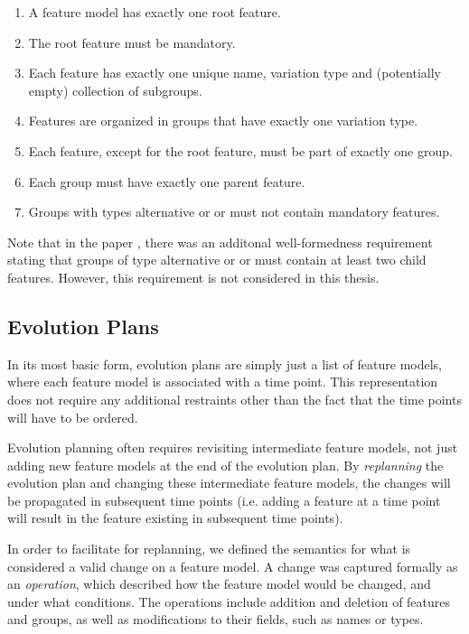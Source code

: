 \documentclass[a4paper,english]{ifimaster}
\begin{document}
\begin{enumerate}[\textit{\textbf{WF\arabic*}}, itemsep=0mm]
  \item A feature model has exactly one root feature.
  \item The root feature must be mandatory.
  \item Each feature has exactly one unique name, variation type and (potentially empty) collection of subgroups.
  \item Features are organized in groups that have exactly one variation type.
  \item Each feature, except for the root feature, must be part of exactly one group.
  \item Each group must have exactly one parent feature.
  \item Groups with types alternative or or must not contain mandatory features.
\end{enumerate}

Note that in the paper \cite{cite:consistency_preserving_evolution_planning}, there was an additonal well-formedness requirement stating that groups of type alternative or or must contain at least two child features. However, this requirement is not considered in this thesis.

\subsection{Evolution Plans}%
\label{sub:evolution_plans}

In its most basic form, evolution plans are simply just a list of feature models, where each feature model is associated with a time point. This representation does not require any additional restraints other than the fact that the time points will have to be ordered.

Evolution planning often requires revisiting intermediate feature models, not just adding new feature models at the end of the evolution plan. By \textit{replanning} the evolution plan and changing these intermediate feature models, the changes will be propagated in subsequent time points (i.e. adding a feature at a time point will result in the feature existing in subsequent time points).

In order to facilitate for replanning, we defined the semantics for what is considered a valid change on a feature model. A change was captured formally as an \textit{operation}, which described how the feature model would be changed, and under what conditions. The operations include addition and deletion of features and groups, as well as modifications to their fields, such as names or types.
\end{document}
